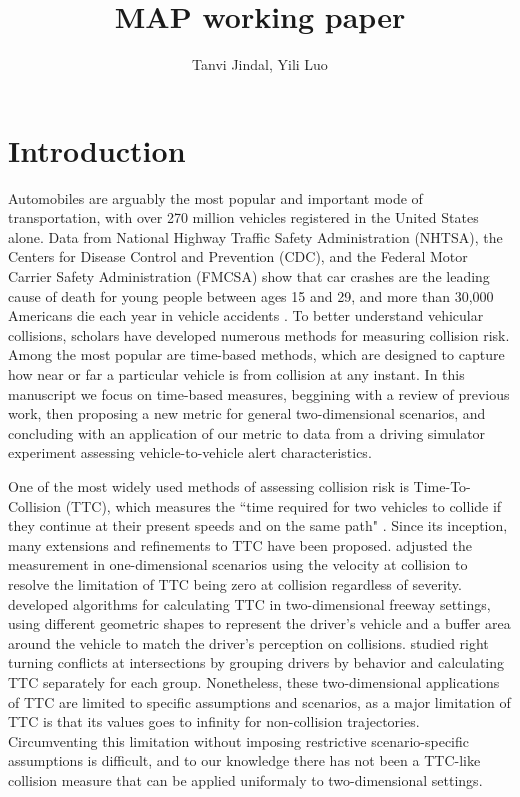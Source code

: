 \documentclass{article}
\title{MAP working paper}
\author{Tanvi Jindal, Yili Luo }
\date{}
\begin{document}
\maketitle

\section{Introduction}
Automobiles are arguably the most popular and important mode of transportation, with over 270 million vehicles registered in the United States alone.  Data from National Highway Traffic Safety Administration (NHTSA), the Centers for Disease Control and Prevention (CDC), and the Federal Motor Carrier Safety Administration (FMCSA) show that car crashes are the leading cause of death for young people between ages 15 and 29, and more than 30,000 Americans die each year in vehicle accidents \citep{Beltz2018}. To better understand vehicular collisions, scholars have developed numerous methods for measuring collision risk. Among the most popular are time-based methods, which are designed to capture how near or far a particular vehicle is from collision at any instant.  In this manuscript we focus on time-based measures, beggining with a review of previous work, then proposing a new metric for general two-dimensional scenarios, and concluding with an application of our metric to data from a driving simulator experiment assessing vehicle-to-vehicle alert characteristics. 

One of the most widely used methods of assessing collision risk is Time-To-Collision (TTC), which measures the ``time required for two vehicles to collide if they continue at their present speeds and on the same path" \citep{Hayward1972}. Since its inception, many extensions and refinements to TTC have been proposed. \citet{Brown2005} adjusted the measurement in one-dimensional scenarios using the velocity at collision to resolve the limitation of TTC being zero at collision regardless of severity.  \citet{Hou2014} developed algorithms for calculating TTC in two-dimensional freeway settings, using different geometric shapes to represent the driver's vehicle and a buffer area around the vehicle to match the driver's perception on collisions. \cite{Sobhani2012} studied right turning conflicts at intersections by grouping drivers by behavior and calculating TTC separately for each group. Nonetheless, these two-dimensional applications of TTC are limited to specific assumptions and scenarios, as a major limitation of TTC is that its values goes to infinity for non-collision trajectories.  Circumventing this limitation without imposing restrictive scenario-specific assumptions is difficult, and to our knowledge there has not been a TTC-like collision measure that can be applied uniformaly to two-dimensional settings.
\end{document}
